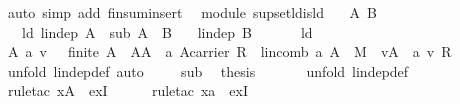 \begin{isabellebody}
\ {\isacharparenleft}auto\ simp\ add{\isacharcolon}\ finsum{\isacharunderscore}insert{\isacharparenright}\isanewline
{}\isamarkupfalse%
%
\endisatagproof
{\isafoldproof}%
%
\isadelimproof
\isanewline
%
\endisadelimproof
\isanewline
{}\isamarkupfalse%
\ {\isacharparenleft}\ module{\isacharparenright}\ supset{\isacharunderscore}ld{\isacharunderscore}is{\isacharunderscore}ld{\isacharcolon}\isanewline
\ \ \ A\ B\isanewline
\ \ \ ld{\isacharcolon}\ {\isachardoublequoteopen}lin{\isacharunderscore}dep\ A{\isachardoublequoteclose}\ \ sub{\isacharcolon}\ {\isachardoublequoteopen}A\ {\isasymsubseteq}\ B{\isachardoublequoteclose}\isanewline
\ \ \ {\isachardoublequoteopen}lin{\isacharunderscore}dep\ B{\isachardoublequoteclose}\isanewline
%
\isadelimproof
%
\endisadelimproof
%
\isatagproof
{}\isamarkupfalse%
\ {\isacharminus}\ \isanewline
\ \ \isamarkupfalse%
\ ld\ \isamarkupfalse%
\ A{\isacharprime}\ a\ v\ \ {}{\isacharcolon}\ {\isachardoublequoteopen}{\isacharparenleft}finite\ A{\isacharprime}\ {\isasymand}\ A{\isacharprime}{\isasymsubseteq}A\ {\isasymand}\ {\isacharparenleft}a{\isasymin}\ {\isacharparenleft}A{\isacharprime}{\isasymrightarrow}carrier\ R{\isacharparenright}{\isacharparenright}\ {\isasymand}\ {\isacharparenleft}lincomb\ a\ A{\isacharprime}\ {\isacharequal}\ {\isasymzero}\isactrlbsub M\isactrlesub {\isacharparenright}\ {\isasymand}\ {\isacharparenleft}v{\isasymin}A{\isacharprime}{\isacharparenright}\ {\isasymand}\ {\isacharparenleft}a\ v{\isasymnoteq}\ {\isasymzero}\isactrlbsub R\isactrlesub {\isacharparenright}{\isacharparenright}{\isachardoublequoteclose}\isanewline
\ \ \ \ \isamarkupfalse%
\ {\isacharparenleft}unfold\ lin{\isacharunderscore}dep{\isacharunderscore}def{\isacharcomma}\ auto{\isacharparenright}\isanewline
\ \ \isamarkupfalse%
\ {}\ sub\ \isamarkupfalse%
\ {\isacharquery}thesis\ \isanewline
\ \ \ \ \isamarkupfalse%
\ {\isacharparenleft}unfold\ lin{\isacharunderscore}dep{\isacharunderscore}def{\isacharparenright}\isanewline
\ \ \ \ \isamarkupfalse%
\ {\isacharparenleft}rule{\isacharunderscore}tac\ x{\isacharequal}{\isachardoublequoteopen}A{\isacharprime}{\isachardoublequoteclose}\ \ exI{\isacharparenright}\isanewline
\ \ \ \ \isamarkupfalse%
\ {\isacharparenleft}rule{\isacharunderscore}tac\ x{\isacharequal}{\isachardoublequoteopen}a{\isachardoublequoteclose}\ \ exI{\isacharparenright}\isanewline

\end{isabellebody}
